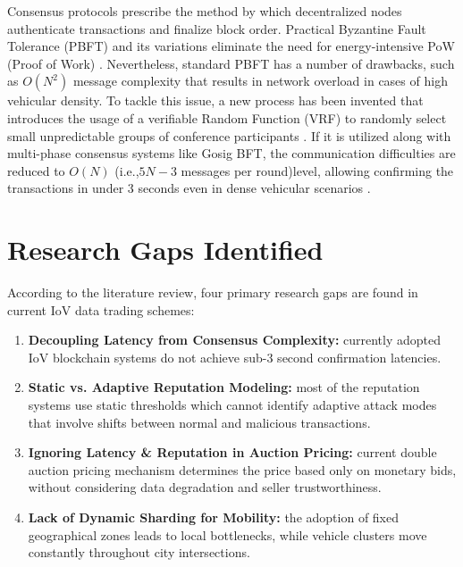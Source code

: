 \noindent
Consensus protocols prescribe the method by which decentralized nodes authenticate transactions and finalize block order. Practical Byzantine Fault Tolerance (PBFT) and its variations eliminate the need for energy-intensive PoW (Proof of Work) \cite{lamport1982byzantine}. Nevertheless, standard PBFT has a number of drawbacks, such as $O(N^2)$ message complexity that results in network overload in cases of high vehicular density.
To tackle this issue, a new process has been invented that introduces the usage of a verifiable Random Function (VRF) to randomly select small unpredictable groups of conference participants \cite{xie2023bephap}. If it is utilized along with multi-phase consensus systems like Gosig BFT, the communication difficulties are reduced to $O(N)$ (i.e.,$5N-3$ messages per round)level, allowing confirming the transactions in under 3 seconds even in dense vehicular scenarios \cite{chen2025lbdt}.

\section{Research Gaps Identified}\label{sec:lit_gaps}

\noindent
According to the literature review, four primary research gaps are found in current IoV data trading schemes:
\begin{enumerate}
    \item \textbf{Decoupling Latency from Consensus Complexity:} currently adopted IoV blockchain systems do not achieve sub-3 second confirmation latencies.

    \item \textbf{Static vs. Adaptive Reputation Modeling:}  most of the reputation systems use static thresholds which cannot identify adaptive attack modes that involve shifts between normal and malicious transactions. 

    \item \textbf{Ignoring Latency \& Reputation in Auction Pricing:} current double auction pricing mechanism determines the price based only on monetary bids, without considering data degradation and seller trustworthiness.

    \item \textbf{Lack of Dynamic Sharding for Mobility:} the adoption of fixed geographical zones leads to local bottlenecks, while vehicle clusters move constantly throughout city intersections.
\end{enumerate}

